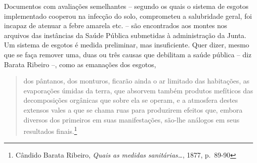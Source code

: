 Documentos com avaliações semelhantes -- segundo os quais o sistema de
esgotos implementado cooperou na infecção do solo, comprometeu a
salubridade geral, foi incapaz de atenuar a febre amarela etc. -- são
encontrados aos montes nos arquivos das instâncias da Saúde Pública
submetidas à administração da Junta. Um sistema de esgotos é medida
preliminar, mas insuficiente. Quer dizer, mesmo que se faça remover uma,
duas ou três causas que debilitam a saúde pública -- diz Barata Ribeiro
--, como as emanações dos esgotos,

\begin{quote}
dos pântanos, dos monturos, ficarão ainda o ar limitado das habitações,
as evaporações úmidas da terra, que absorvem também produtos mefíticos
das decomposições orgânicas que sobre ela se operam, e a atmosfera
destes extensos vales a que se chama ruas para produzirem efeitos que,
embora diversos dos primeiros em suas manifestações, são-lhe análogos em
seus resultados finais.\footnote{Cândido Barata Ribeiro, \emph{Quais as
  medidas sanitárias\ldots{}}, 1877, p.~89-90}
\end{quote}

